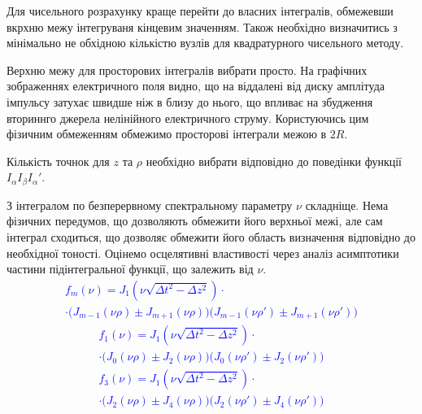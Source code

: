 Для чисельного розрахунку краще перейти до власних інтегралів, обмежевши
вкрхню межу інтегруваня кінцевим значенням. Також необхідно визначитись з 
мінімально не обхідною кількістю вузлів для квадратурного чисельного методу.

Верхню межу для просторових інтегралів вибрати просто. На графічних 
зображеннях електричного поля видно, що на віддалені від диску амплітуда
імпульсу затухає швидше ніж в близу до нього, що впливає на збудження 
вториннго джерела нелінійного електричного струму. Користуючись цим фізичним
обмеженням обмежимо просторові інтеграли межою в $ 2R $. 

Кількість точнок для $ z $ та $ \rho $ необхідно вибрати відповідно до поведінки 
функції $ I_\alpha I_\beta {I_\alpha}' $.

З інтегралом по безперервному спектральному параметру $ \nu $ складніще.
Нема фізичних передумов, що дозволяють обмежити його верхньої межі, але сам 
інтеграл сходиться, що дозволяє обмежити його область визначення відповідно 
до необхідної тоності. Оцінемо осцелятивні властивості через аналіз 
асимптотики частини підінтегральної функції, що залежить від $ \nu $.
%
\textcolor{blue} { \begin{equation*} \begin{aligned}
f_m (\nu) = J_1 \left( \nu \sqrt{\Delta t^2 - \Delta z^2} \right) \cdot \\ 
\cdot \Big( J_{m-1} (\nu \rho) \pm J_{m+1} (\nu \rho) \Big) 
\Big( J_{m-1} (\nu \rho') \pm J_{m+1} (\nu \rho') \Big)
\end{aligned} \end{equation*} }
%
\textcolor{blue} { \begin{equation*} \begin{aligned}
f_1 (\nu) = J_1 \left( \nu \sqrt{\Delta t^2 - \Delta z^2} \right) \cdot \\ 
\cdot \Big( J_{0} (\nu \rho) \pm J_{2} (\nu \rho) \Big) 
\Big( J_{0} (\nu \rho') \pm J_{2} (\nu \rho') \Big)
\end{aligned} \end{equation*} }
%
\textcolor{blue} { \begin{equation*} \begin{aligned}
f_3 (\nu) = J_1 \left( \nu \sqrt{\Delta t^2 - \Delta z^2} \right) \cdot \\ 
\cdot \Big( J_{2} (\nu \rho) \pm J_{4} (\nu \rho) \Big) 
\Big( J_{2} (\nu \rho') \pm J_{4} (\nu \rho') \Big)
\end{aligned} \end{equation*} }
